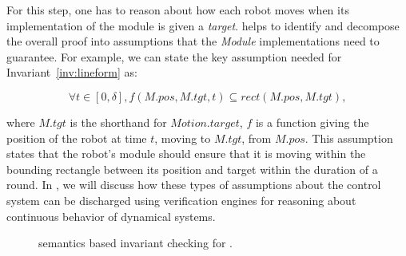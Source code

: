For this step, one has to reason about how each robot moves when its implementation of the \Motion module is given a \emph{target}.
\lgname helps to identify and decompose the overall proof into assumptions that the \emph{Module} implementations need to guarantee.
For example, we can state the key assumption needed for Invariant~\ref{inv:lineform} as:
\begin{assumption}
\label{lineform-assume}
\[
\forall t \in [0, \delta], f(M.pos, M.tgt, t) \subseteq rect(M.pos, M.tgt),
\]
\end{assumption}
\noindent
where $M.tgt$ is the shorthand for $Motion.target$,
$f$ is a function giving the position of the robot at time $t$, moving to $M.tgt$, from $M.pos$.
This assumption states that the robot's \Motion module should ensure that it is moving within the bounding rectangle between its position and target within the duration of a round.
In , we will discuss how these types of assumptions about the control system can be discharged using verification engines for reasoning about continuous behavior of dynamical systems.

\begin{figure}
\caption{\K semantics based invariant checking for \lgname.}
\label{fig:tools}
\end{figure}


